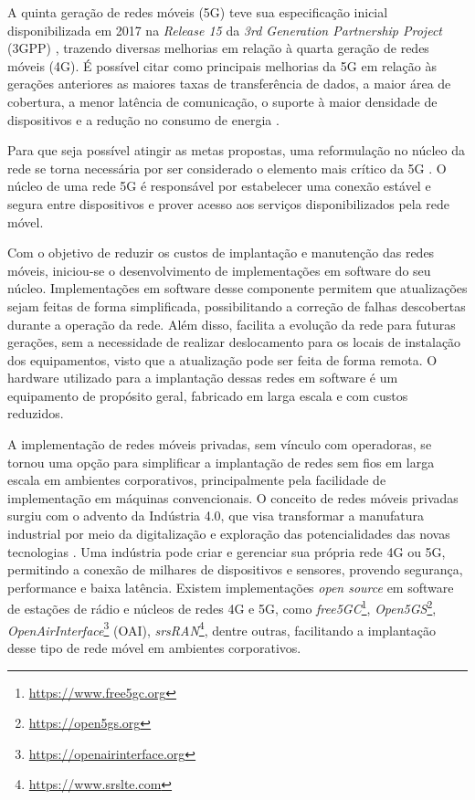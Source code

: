 A quinta geração de redes móveis (5G) teve sua especificação inicial disponibilizada em 2017 na \textit{Release 15} da \textit{3rd Generation Partnership Project} (3GPP) \cite{Redana2020}, trazendo diversas melhorias em relação à quarta geração de redes móveis (4G).
É possível citar como principais melhorias da 5G em relação às gerações anteriores as maiores taxas de transferência de dados, a maior área de cobertura, a menor latência de comunicação, o suporte à maior densidade de dispositivos e a redução no consumo de energia \cite{Ahmad2019}.

Para que seja possível atingir as metas propostas, uma reformulação no núcleo da rede se torna necessária por ser considerado o elemento mais crítico da 5G \cite{Cardoso2020}.
O núcleo de uma rede 5G é responsável por estabelecer uma conexão estável e segura entre dispositivos e prover acesso aos serviços disponibilizados pela rede móvel.

Com o objetivo de reduzir os custos de implantação e manutenção das redes móveis, iniciou-se o desenvolvimento de implementações em software do seu núcleo.
Implementações em software desse componente permitem que atualizações sejam feitas de forma simplificada, possibilitando a correção de falhas descobertas durante a operação da rede. Além disso, facilita a evolução da rede para futuras gerações, sem a necessidade de realizar deslocamento para os locais de instalação dos equipamentos, visto que a atualização pode ser feita de forma remota.
O hardware utilizado para a implantação dessas redes em software é um equipamento de propósito geral, fabricado em larga escala e com custos reduzidos.

A implementação de redes móveis privadas, sem vínculo com operadoras, se tornou uma opção para simplificar a implantação de redes sem fios em larga escala em ambientes corporativos, principalmente pela facilidade de implementação em máquinas convencionais.
O conceito de redes móveis privadas surgiu com o advento da Indústria 4.0, que visa transformar a manufatura industrial por meio da digitalização e exploração das potencialidades das novas tecnologias \cite{Rojko2017}.
Uma indústria pode criar e gerenciar sua própria rede 4G ou 5G, permitindo a conexão de milhares de dispositivos e sensores, provendo segurança, performance e baixa latência.
Existem implementações \textit{open source} em software de estações de rádio e núcleos de redes 4G e 5G, como \textit{free5GC}\footnote{\url{https://www.free5gc.org}}, \textit{Open5GS}\footnote{\url{https://open5gs.org}}, \textit{OpenAirInterface}\footnote{\url{https://openairinterface.org}} (OAI), \textit{srsRAN}\footnote{\url{https://www.srslte.com}}, dentre outras, facilitando a implantação desse tipo de rede móvel em ambientes corporativos.

